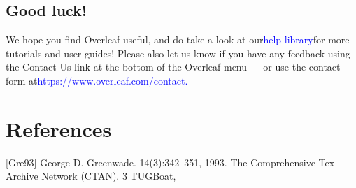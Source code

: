 \documentclass{article} %
\begin{document}
\begin{table}[h]
			\subsection{Good luck!}
				We hope you find Overleaf useful, and do take a look at our\textcolor{blue}{help library}for more tutorials and user
				guides! Please also let us know if you have any feedback using the Contact Us link at the bottom of
				the Overleaf menu — or use the contact form at\textcolor{blue} {https://www.overleaf.com/contact.}
				\section{References}
					[Gre93] George D. Greenwade.
					14(3):342–351, 1993.
					The Comprehensive Tex Archive Network (CTAN).
					3
					TUGBoat,
				
		\end{table}
\end{document}
